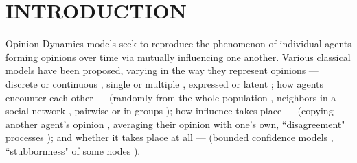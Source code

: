 
\section{INTRODUCTION}

Opinion Dynamics models seek to reproduce the phenomenon of individual agents
forming opinions over time via mutually influencing one another. Various
classical models have been proposed, varying in 
the way they represent opinions --- 
    discrete \cite{follmer_random_1974,yildiz_discrete_2011} or
    continuous \cite{ghaderi_opinion_2012,weisbuch_interacting_2001},
    single \cite{weisbuch_dynamical_1999} or 
    multiple \cite{deffuant_mixing_2000,sirbu_opinion_2013},
    expressed or latent \cite{friedkin_social_1990};
how agents encounter each other ---
    (randomly from the whole population \cite{hegselmann_opinion_2002}, %
    neighbors in a social network \cite{clifford_model_1973,holley_ergodic_1975},
    pairwise or in groups \cite{degroot_reaching_1974});
how influence takes place ---
    (copying another agent's opinion \cite{holley_ergodic_1975},
    averaging their opinion with one's own,  %
    ``disagreement" processes \cite{sirbu_opinion_2013});
and whether it takes place at all ---
    (bounded confidence models \cite{hegselmann_opinion_2002}, %
    ``stubbornness" of some nodes \cite{yildiz_discrete_2011}).


